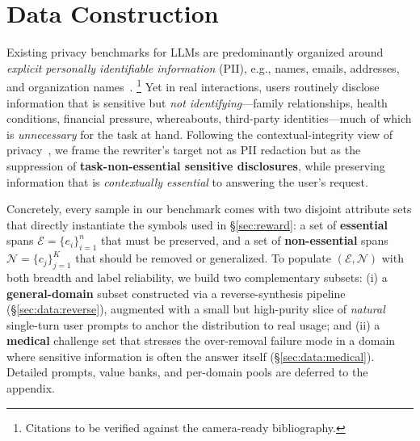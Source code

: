 \section{Data Construction}
\label{sec:data}

Existing privacy benchmarks for LLMs are predominantly organized
around \emph{explicit personally identifiable information} (PII),
e.g., names, emails, addresses, and organization
names~\citep{pilan2022text,lukas2023analyzing}.%
\footnote{Citations to be verified against the camera-ready bibliography.}
Yet in real interactions, users routinely disclose information that
is sensitive but \emph{not identifying}---family relationships,
health conditions, financial pressure, whereabouts, third-party
identities---much of which is \emph{unnecessary} for the task at
hand. Following the contextual-integrity view of
privacy~\citep{nissenbaum2010privacy,mireshghallah2024can,ngong2025contextual},
we frame the rewriter's target not as PII redaction but as the
suppression of \textbf{task-non-essential sensitive disclosures},
while preserving information that is \emph{contextually essential} to
answering the user's request.

Concretely, every sample in our benchmark comes with two disjoint
attribute sets that directly instantiate the symbols used in
\S\ref{sec:reward}: a set of \textbf{essential} spans
$\mathcal{E}=\{e_i\}_{i=1}^{n}$ that must be preserved, and a set of
\textbf{non-essential} spans $\mathcal{N}=\{c_j\}_{j=1}^{K}$ that
should be removed or generalized. To populate
$(\mathcal{E},\mathcal{N})$ with both breadth and label reliability,
we build two complementary subsets: (i) a \textbf{general-domain}
subset constructed via a reverse-synthesis pipeline
(\S\ref{sec:data:reverse}), augmented with a small but high-purity
slice of \emph{natural} single-turn user prompts to anchor the
distribution to real usage; and (ii) a \textbf{medical} challenge
set that stresses the over-removal failure mode in a domain where
sensitive information is often the answer itself
(\S\ref{sec:data:medical}). Detailed prompts, value banks, and
per-domain pools are deferred to the appendix.

